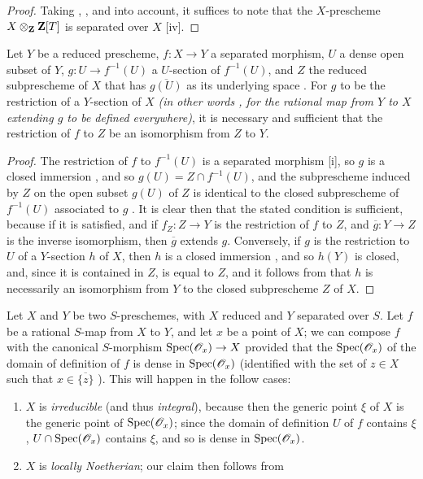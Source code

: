 \begin{proof}
\label{proof-1.7.2.6}
Taking , , and  into account, it suffices to note that the $X$-prescheme $X\otimes_{\mathbf{Z}}\mathbf{Z}[T]$ is separated over $X$ [iv].
\end{proof}

\begin{cor}[7.2.7]
\label{1.7.2.7}
Let $Y$ be a reduced prescheme, $f:X\to Y$ a separated morphism, $U$ a dense open subset of $Y$, $g:U\to f^{-1}(U)$ a $U$-section of $f^{-1}(U)$, and $Z$ the reduced subprescheme of $X$ that has $\overline{g(U)}$ as its underlying space .
For $g$ to be the restriction of a $Y$-section of $X$ \emph{(in other words , for the rational map from $Y$ to $X$ extending $g$ to be defined everywhere)}, it is necessary and sufficient that the restriction of $f$ to $Z$ be an isomorphism from $Z$ to $Y$.
\end{cor}

\begin{proof}
\label{proof-1.7.2.7}
The restriction of $f$ to $f^{-1}(U)$ is a separated morphism [i], so $g$ is a closed immersion , and so $g(U)=Z\cap f^{-1}(U)$, and the subprescheme induced by $Z$ on the open subset $g(U)$ of $Z$ is identical to the closed subprescheme of $f^{-1}(U)$ associated to $g$ .
It is clear then that the stated condition is sufficient, because if it is satisfied, and if $f_Z:Z\to Y$ is the restriction of $f$ to $Z$, and $\overline{g}:Y\to Z$ is the inverse isomorphism, then $\overline{g}$ extends $g$.
Conversely, if $g$ is the restriction to $U$ of a $Y$-section $h$ of $X$, then $h$ is a closed immersion , and so $h(Y)$ is closed, and, since it is contained in $Z$, is equal to $Z$, and it follows from  that $h$ is necessarily an isomorphism from $Y$ to the closed subprescheme $Z$ of $X$.
\end{proof}

\begin{env}[7.2.8]
\label{1.7.2.8}
Let $X$ and $Y$ be two $S$-preschemes, with $X$ reduced and $Y$ separated over $S$.
Let $f$ be a rational $S$-map from $X$ to $Y$, and let $x$ be a point of $X$; we can compose $f$ with the canonical $S$-morphism ${\mathop{\mathrm{Spec}}\nolimits}(\mathscr{O}_x)\to X$  provided that the  ${\mathop{\mathrm{Spec}}\nolimits}(\mathscr{O}_x)$ of the domain of definition of $f$ is dense in ${\mathop{\mathrm{Spec}}\nolimits}(\mathscr{O}_x)$ (identified with the set of $z\in X$ such that $x\in\overline{\{z\}}$ ).
This will happen in the follow cases:
\begin{enumerate}
    \item $X$ is \emph{irreducible} (and thus \emph{integral}), because then the generic point $\xi$ of $X$ is the generic point of ${\mathop{\mathrm{Spec}}\nolimits}(\mathscr{O}_x)$; since the domain of definition $U$ of $f$ contains $\xi$, $U\cap{\mathop{\mathrm{Spec}}\nolimits}(\mathscr{O}_x)$ contains $\xi$, and so is dense in ${\mathop{\mathrm{Spec}}\nolimits}(\mathscr{O}_x)$.
    \item $X$ is \emph{locally Noetherian}; our claim then follows from
\end{enumerate}
\end{env}

